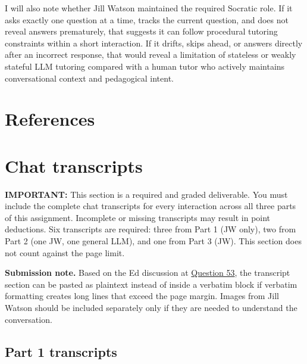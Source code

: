 \documentclass[
	letterpaper, %
]{jdf}
\begin{document}
I will also note whether Jill Watson maintained the required Socratic role. If it asks exactly one question at a time, tracks the current question, and does not reveal answers prematurely, that suggests it can follow procedural tutoring constraints within a short interaction. If it drifts, skips ahead, or answers directly after an incorrect response, that would reveal a limitation of stateless or weakly stateful LLM tutoring compared with a human tutor who actively maintains conversational context and pedagogical intent.


\section{References}
\printbibliography[heading=none]


\section{Chat transcripts}

\textbf{IMPORTANT:} This section is a required and graded deliverable. You must include the complete chat transcripts for every interaction across all three parts of this assignment. Incomplete or missing transcripts may result in point deductions. Six transcripts are required: three from Part 1 (JW only), two from Part 2 (one JW, one general LLM), and one from Part 3 (JW). This section does not count against the page limit.

\textbf{Submission note.} Based on the Ed discussion at \href{https://edstem.org/us/courses/98722/discussion/8088626?answer=18711024}{Question 53}, the transcript section can be pasted as plaintext instead of inside a verbatim block if verbatim formatting creates long lines that exceed the page margin. Images from Jill Watson should be included separately only if they are needed to understand the conversation.

\subsection{Part 1 transcripts}
\end{document}
